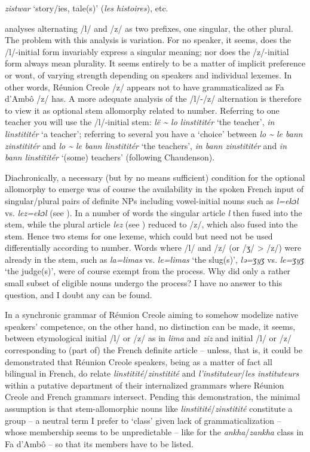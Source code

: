 \documentclass[output=paper]{langscibook}
\begin{document}
\textit{zistwar} ‘story/ies, tale(s)’ (\textit{les histoires}), etc.

\citet{Caron2011} analyses alternating /l/ and /z/ as two prefixes, one singular, the other plural. The problem with this analysis is variation. For no speaker, it seems, does the /l/-initial form invariably express a singular meaning; nor does the /z/-initial form always mean plurality. It seems entirely to be a matter of implicit preference or wont, of varying strength depending on speakers and individual lexemes. In other words, Réunion Creole /z/ appears not to have grammaticalized as Fa d’Ambô /z/ has. A more adequate analysis of the /l/-/z/ alternation is therefore to view it as optional stem allomorphy related to number. Referring to one teacher you will use the /l/-initial stem: \textit{lë {\textasciitilde} lo linstititér} ‘the teacher’, \textit{in linstititér} ‘a teacher’; referring to several you have a ‘choice’ between \textit{lo {\textasciitilde} le bann zinstititér} and  \textit{lo {\textasciitilde} le bann linstititér} ‘the teachers’, \textit{in bann zinstititér} and \textit{in bann linstititér} ‘(some) teachers’ (following Chaudenson).

Diachronically, a necessary (but by no means sufficient) condition for the optional allomorphy to emerge was of course the availability in the spoken French input of singular/plural pairs of definite NPs including vowel-initial nouns such as \textit{l=ekɔl} vs. \textit{lez=ekɔl} (see ). In a number of words the singular article \textit{l} then fused into the stem, while the plural article \textit{lez} (see ) reduced to /z/, which also fused into the stem. Hence two stems for one lexeme, which could but need not be used differentially according to number. Words where /l/ and /z/ (or /ʒ/ > /z/) were already in the stem, such as \textit{la=limas} vs. \textit{le=limas} ‘the slug(s)’, \textit{lə=ʒyʒ} vs. \textit{le=ʒyʒ} ‘the judge(s)’, were of course exempt from the process. Why did only a rather small subset of eligible nouns undergo the process? I have no answer to this question, and I doubt any can be found.

In a synchronic grammar of Réunion Creole aiming to somehow modelize native speakers’ competence, on the other hand, no distinction can be made, it seems, between etymological initial /l/ or /z/ as in \textit{lima} and \textit{ziz} and initial /l/ or /z/ corresponding to (part of) the French definite article – unless, that is, it could be demonstrated that Réunion Creole speakers, being as a matter of fact all bilingual in French, do relate \textit{linstitité}\slash\textit{zinstitité} and \textit{l’instituteur}/\textit{les instituteurs} within a putative department of their internalized grammars where Réunion Creole and French grammars intersect. Pending this demonstration, the minimal assumption is that stem-allomorphic nouns like \textit{linstitité}/\textit{zinstitité} constitute a group -- a neutral term I prefer to ‘class’ given lack of grammaticalization -- whose membership seems to be unpredictable -- like for the \textit{ankha}/\textit{zankha} class in Fa d’Ambô -- so that its members have to be listed.
\end{document}
